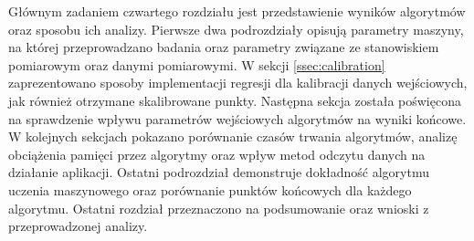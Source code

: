 Głównym zadaniem czwartego rozdziału jest przedstawienie wyników algorytmów oraz sposobu ich analizy. Pierwsze dwa podrozdziały opisują parametry maszyny, na której przeprowadzano badania oraz parametry związane ze stanowiskiem pomiarowym oraz danymi pomiarowymi. W sekcji \ref{ssec:calibration} zaprezentowano sposoby implementacji regresji dla kalibracji danych wejściowych, jak również otrzymane skalibrowane punkty. Następna sekcja została poświęcona na sprawdzenie wpływu parametrów wejściowych algorytmów na wyniki końcowe. W kolejnych sekcjach pokazano porównanie czasów trwania algorytmów, analizę obciążenia pamięci przez algorytmy oraz wpływ metod odczytu danych na działanie aplikacji. Ostatni podrozdział demonstruje dokładność algorytmu uczenia maszynowego oraz porównanie punktów końcowych dla każdego algorytmu. Ostatni rozdział przeznaczono na podsumowanie oraz wnioski z przeprowadzonej analizy.
